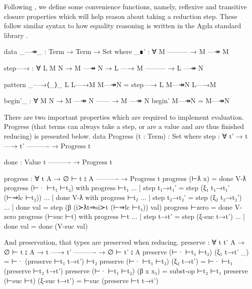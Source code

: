 \documentclass[logo,bsc,singlespacing,parskip,online]{infthesis}
\renewenvironment{code}{\mintedcopy[breaklines,breaksymbolleft=\;]{agda}}{\endmintedcopy}
\begin{document}
Following \citet{wadler_programming_2022}, we define some convenience functions, namely, reflexive
and transitive closure properties which will help reason about taking a reduction step. These follow
similar syntax to how equality reasoning is written in the Agda standard library
\citep{the_agda_community_agda_2024}.
\begin{comment}
\begin{code}
  infix  2 _—↠_
  infix  1 begin'_
  infixr 2 _—→⟨_⟩_
  infix  3 _∎'
\end{code}
\end{comment}
\begin{code}
  data _—↠_ : Term → Term → Set where
    _∎' : ∀ M
        ---------
      → M —↠ M

    step—→ : ∀ L {M N}
      → M —↠ N
      → L —→ M
        ---------
      → L —↠ N

  pattern _—→⟨_⟩_ L L—→M M—↠N = step—→ L M—↠N L—→M

  begin'_ : ∀ {M N}
    → M —↠ N
      ------
    → M —↠ N
  begin' M—↠N = M—↠N
\end{code}

There are two important properties which are required to implement evaluation. Progress (that terms
can always take a step, or are a value and are thus finished reducing) is presented below.
\begin{code}
  data Progress (t : Term) : Set where
    step : ∀ {t'}
      → t —→ t'
        ----------
      → Progress t

    done :
        Value t
        ----------
      → Progress t

  progress : ∀ {t A}
    → ∅ ⊢ t ⦂ A
      ----------
    → Progress t
  progress (⊢ƛ x) = done V-ƛ
  progress (⊢· ⊢t₁ ⊢t₂) with progress ⊢t₁
  ... | step t₁→t₁' = step (ξ₁ t₁→t₁' (⊢⇒lc ⊢t₂))
  ... | done V-ƛ with progress ⊢t₂
  ...   | step t₂→t₂' = step (ξ₂ t₂→t₂')
  ...   | done val    = step (β (i≻ƛt⇒si≻t (⊢⇒lc ⊢t₁)) val)
  progress ⊢zero = done V-zero
  progress (⊢suc ⊢t) with progress ⊢t
  ... | step t→t' = step (ξ-suc t→t')
  ... | done val  = done (V-suc val)
\end{code}

And preservation, that types are preserved when reducing.
\begin{code}
  preserve : ∀ {t t' A}
    → ∅ ⊢ t ⦂ A
    → t —→ t'
      ----------
    → ∅ ⊢ t' ⦂ A
  preserve (⊢· ⊢t₁ ⊢t₂) (ξ₁ t→t' _) = ⊢· (preserve ⊢t₁ t→t') ⊢t₂
  preserve (⊢· ⊢t₁ ⊢t₂) (ξ₂ t→t') = ⊢· ⊢t₁  (preserve ⊢t₂ t→t')
  preserve (⊢· ⊢t₁ ⊢t₂) (β x x₁) = subst-op ⊢t₂ ⊢t₁
  preserve (⊢suc ⊢t) (ξ-suc t→t') = ⊢suc (preserve ⊢t t→t')
\end{code}
\end{document}
